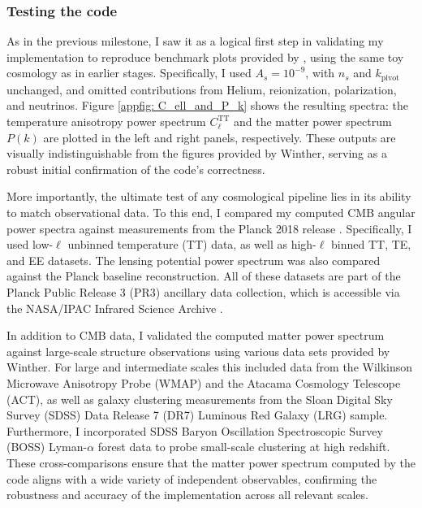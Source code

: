 \documentclass{aa}
\numberwithin{equation}{section}
\numberwithin{table}{section}
\numberwithin{figure}{section}
\begin{document}
\subsubsection{Testing the code}
As in the previous milestone, I saw it as a logical first step in validating my implementation to reproduce benchmark plots provided by \cite{Course}, using the same toy cosmology as in earlier stages. Specifically, I used $A_s = 10^{-9}$, with $n_s$ and $k_{\text{pivot}}$ unchanged, and omitted contributions from Helium, reionization, polarization, and neutrinos. Figure \ref{appfig: C_ell_and_P_k} shows the resulting spectra: the temperature anisotropy power spectrum $C_\ell^{\text{TT}}$ and the matter power spectrum $P(k)$ are plotted in the left and right panels, respectively. These outputs are visually indistinguishable from the figures provided by Winther, serving as a robust initial confirmation of the code's correctness. 

More importantly, the ultimate test of any cosmological pipeline lies in its ability to match observational data. To this end, I compared my computed CMB angular power spectra against measurements from the Planck 2018 release \citep[see][]{Planck}. Specifically, I used low-$\ell$ unbinned temperature (TT) data, as well as high-$\ell$ binned TT, TE, and EE datasets. The lensing potential power spectrum was also compared against the Planck baseline reconstruction. All of these datasets are part of the Planck Public Release 3 (PR3) ancillary data collection, which is accessible via the NASA/IPAC Infrared Science Archive \citep[see][]{PlanckPR3}. 

In addition to CMB data, I validated the computed matter power spectrum against large-scale structure observations using various data sets provided by Winther. For large and intermediate scales this included data from the Wilkinson Microwave Anisotropy Probe (WMAP) and the Atacama Cosmology Telescope (ACT), as well as galaxy clustering measurements from the Sloan Digital Sky Survey (SDSS) Data Release 7 (DR7) Luminous Red Galaxy (LRG) sample. Furthermore, I incorporated SDSS Baryon Oscillation Spectroscopic Survey (BOSS) Lyman-$\alpha$ forest data to probe small-scale clustering at high redshift. These cross-comparisons ensure that the matter power spectrum computed by the code aligns with a wide variety of independent observables, confirming the robustness and accuracy of the implementation across all relevant scales.
\end{document}
